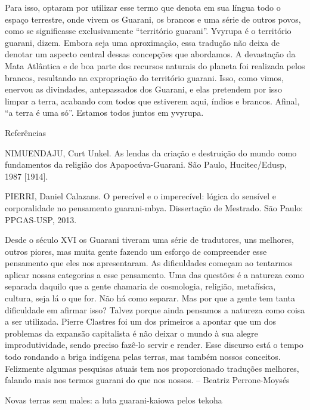 \documentclass{article}
\begin{document}
Para isso, optaram por utilizar esse termo que denota em sua l\'ingua
todo o espa\c{c}o terrestre, onde vivem os Guarani, os brancos e uma
s\'erie de outros povos, como se significasse exclusivamente
{\textquotedblleft}territ\'orio guarani{\textquotedblright}. Yvyrupa
\'e o territ\'orio guarani, dizem. Embora seja uma aproxima\c{c}\~ao,
essa tradu\c{c}\~ao n\~ao deixa de denotar um aspecto central dessas
concep\c{c}\~oes que abordamos. A devasta\c{c}\~ao da Mata Atl\^antica
e de boa parte dos recursos naturais do planeta foi realizada pelos
brancos, resultando na expropria\c{c}\~ao do territ\'orio guarani.
Isso, como vimos, enervou as divindades, antepassados dos Guarani, e
elas pretendem por isso limpar a terra, acabando com todos que
estiverem aqui, \'indios e brancos. Afinal, {\textquotedblleft}a terra
\'e uma s\'o{\textquotedblright}. Estamos todos juntos em yvyrupa.

Refer\^encias

NIMUENDAJU, Curt Unkel. As lendas da cria\c{c}\~ao e destrui\c{c}\~ao do
mundo como fundamentos da religi\~ao dos Apapoc\'uva-Guarani. S\~ao
Paulo, Hucitec/Edusp, 1987 [1914].

PIERRI, Daniel Calazans. O perec\'ivel e o imperec\'ivel: l\'ogica do
sens\'ivel e corporalidade no pensamento guarani-mbya.
Disserta\c{c}\~ao de Mestrado. S\~ao Paulo: PPGAS-USP, 2013.

Desde o s\'eculo XVI os Guarani tiveram uma s\'erie de tradutores, uns
melhores, outros piores, mas muita gente fazendo um esfor\c{c}o de
compreender esse pensamento que eles nos apresentaram. As dificuldades
come\c{c}am ao tentarmos aplicar nossas categorias a esse pensamento.
Uma das quest\~oes \'e a natureza como separada daquilo que a gente
chamaria de cosmologia, religi\~ao, metaf\'isica, cultura, seja l\'a o
que for. N\~ao h\'a como separar. Mas por que a gente tem tanta
dificuldade em afirmar isso? Talvez porque ainda pensamos a natureza
como coisa a ser utilizada. Pierre Clastres foi um dos primeiros a
apontar que um dos problemas da expans\~ao capitalista \'e n\~ao deixar
o mundo \`a sua alegre improdutividade, sendo preciso faz\^e-lo servir
e render. Esse discurso est\'a o tempo todo rondando a briga ind\'igena
pelas terras, mas tamb\'em nossos conceitos. Felizmente algumas
pesquisas atuais tem nos proporcionado tradu\c{c}\~oes melhores,
falando mais nos termos guarani do que nos nossos. -- Beatriz
Perrone-Moys\'es

Novas terras sem males: a luta guarani-kaiowa pelos tekoha
\end{document}
